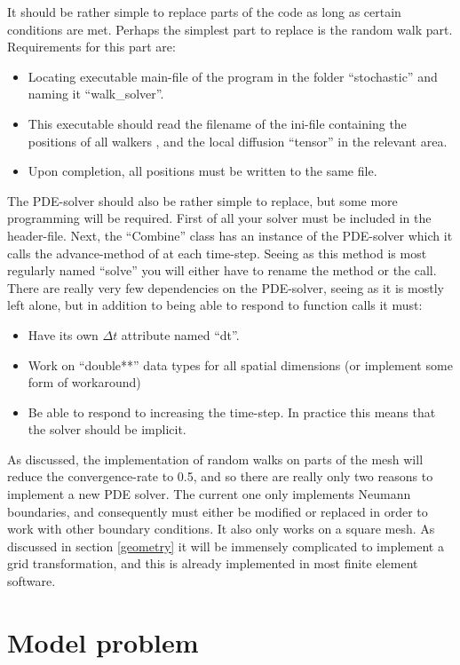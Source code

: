 It should be rather simple to replace parts of the code as long as certain conditions are met. Perhaps the simplest part to replace is the random walk part. 
Requirements for this part are:
\begin{itemize}
 \item Locating executable main-file of the program in the folder ``stochastic'' and naming it ``walk\_solver''. 
 \item This executable should read the filename of the ini-file containing the positions of all walkers , and the local diffusion ``tensor'' in the relevant area.
 \item Upon completion, all positions must be written to the same file.
\end{itemize}
The PDE-solver should also be rather simple to replace, but some more programming will be required. First of all your solver must be included in the header-file. 
Next, the ``Combine'' class has an instance of the PDE-solver which it calls the advance-method of at each time-step. Seeing as this method is most regularly named ``solve'' you will either have to rename the method or the call. 
There are really very few dependencies on the PDE-solver, seeing as it is mostly left alone, but in addition to being able to respond to function calls it must:
\begin{itemize}
 \item Have its own $\Delta t$ attribute named ``dt''.
 \item Work on ``double**'' data types for all spatial dimensions (or implement some form of workaround)
 \item Be able to respond to increasing the time-step. In practice this means that the solver should be implicit.
\end{itemize}
As discussed, the implementation of random walks on parts of the mesh will reduce the convergence-rate to 0.5, and so there are really only two reasons to implement a new PDE solver. 
The current one only implements Neumann boundaries, and consequently must either be modified or replaced in order to work with other boundary conditions.
It also only works on a square mesh. As discussed in section \ref{geometry} it will be immensely complicated to implement a grid transformation, and this is already implemented in most finite element software.

\section{Model problem}


